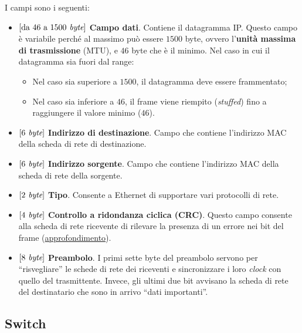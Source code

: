 \documentclass[a4paper]{article}
\newcommand{\dquotes}[1]{``#1''}
\begin{document}
	\noindent
	I campi sono i seguenti:
	\begin{itemize}
		\item $\left[\text{da } 46 \text{ a } 1500 \emph{ byte}\right]$ \textbf{Campo dati}. Contiene il datagramma IP. Questo campo è variabile perché al massimo può essere $1500$ byte, ovvero l’\textbf{unità massima di trasmissione} (\textsf{MTU}), e $46$ byte che è il minimo. Nel caso in cui il datagramma sia fuori dal range:
		\begin{itemize}
			\item Nel caso sia superiore a $1500$, il datagramma deve essere frammentato;
			\item Nel caso sia inferiore a $46$, il frame viene riempito (\emph{stuffed}) fino a raggiungere il valore minimo ($46$).
		\end{itemize}
		
		\item $\left[6 \emph{ byte}\right]$ \textbf{Indirizzo di destinazione}. Campo che contiene l’indirizzo MAC della scheda di rete di destinazione.
		
		\item $\left[6 \emph{ byte}\right]$ \textbf{Indirizzo sorgente}. Campo che contiene l’indirizzo MAC della scheda di rete della sorgente.
		
		\item $\left[2 \emph{ byte}\right]$ \textbf{Tipo}. Consente a Ethernet di supportare vari protocolli di rete.
		
		\item $\left[4 \emph{ byte}\right]$ \textbf{Controllo a ridondanza ciclica (CRC)}. Questo campo consente alla scheda di rete ricevente di rilevare la presenza di un errore nei bit del frame (\href{https://it.wikipedia.org/wiki/Cyclic_redundancy_check}{approfondimento}).\label{CRC}
		
		\item $\left[8 \emph{ byte}\right]$ \textbf{Preambolo}. I primi sette byte del preambolo servono per \dquotes{risvegliare} le schede di rete dei riceventi e sincronizzare i loro \emph{clock} con quello del trasmittente. Invece, gli ultimi due bit avvisano la scheda di rete del destinatario che sono in arrivo \dquotes{dati importanti}.
	\end{itemize}\newpage

	\subsection{Switch}
	
\end{document}
